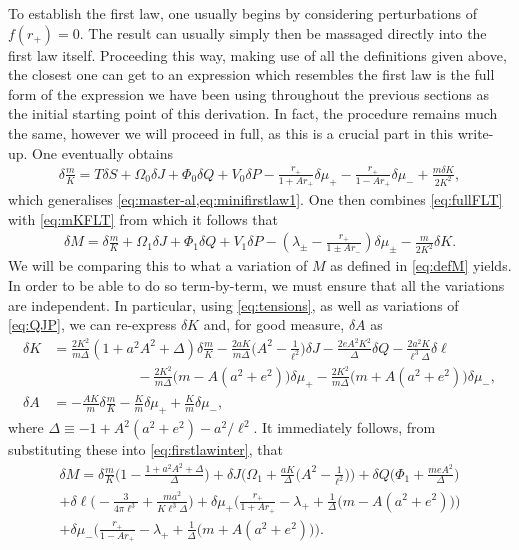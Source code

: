 \documentclass[
twoside,
openright,
frontopenright,
]{dmathesis}
\newcommand{\nn}{\nonumber}
\begin{document}
To establish the first law, one usually begins by considering perturbations of
$f(r_+)=0$. The result can usually simply then be massaged directly into the
first law itself. Proceeding this way, making use of all the definitions given
above, the closest one can get to an expression which resembles the first law is
the full form of the expression we have been using throughout the previous
sections as the initial starting point of this derivation. In fact, the
procedure remains much the same, however we will proceed in full, as this is a
crucial part in this write-up. One eventually obtains
\begin{align}\label{eq:mKFLT}
\delta \frac{m}{K} = T\delta S + \Omega_0 \delta J + \Phi_0 \delta Q + V_0
  \delta P - \frac{r_+}{1+Ar_+} \delta \mu_+ - \frac{r_+}{1-Ar_+}\delta \mu_-
  +\frac{m\delta K}{2K^2},
\end{align}
which generalises \cref{eq:master-al,eq:minifirstlaw1}. One then combines
\cref{eq:fullFLT} with \cref{eq:mKFLT} from which it follows that
\begin{align}\label{eq:firstlawinter}
\delta M = \delta \frac{m}{K} + \Omega_1 \delta J + \Phi_1 \delta Q + V_1 \delta
  P - \left(\lambda_\pm - \frac{r_+}{1\pm Ar_-}\right) \delta \mu_\pm -
  \frac{m}{2K^2}\delta K. 
\end{align}
We will be comparing this to what a variation of $M$ as defined in
\cref{eq:defM} yields. In order to be able to do so term-by-term, we must ensure
that all the variations are independent. In particular, using
\cref{eq:tensions}, as well as variations of \cref{eq:QJP}, we can re-express
$\delta K$ and, for good measure, $\delta A$ as
\begin{align}
\delta K &=\frac{2K^2}{m\Delta}(1+a^2A^2+\Delta) \delta \frac{m}{K} \nn -
           \frac{2aK}{m\Delta}\Big(A^2-\frac{1}{\ell^2}\Big)\delta
           J-\frac{2eA^2K^2}{\Delta}\delta Q-\frac{2a^2K}{\ell^3\Delta}\delta
           \ell\\ 
&\qquad\qquad\qquad -\frac{2K^2}{m\Delta}\big(m-A(a^2+e^2)\big)\delta\mu_+
                     -\frac{2K^2}{m\Delta}\big(m+A(a^2+e^2)\big)\delta\mu_-,
                     \nn\\ 
\delta A &=-\frac{A K}{m}\delta\frac{m}{K}-\frac{K}{m}\delta\mu_+ +
           \frac{K}{m}\delta \mu_-,
\label{eq:dKdA}
\end{align}
where $\Delta \equiv -1+A^2(a^2+e^2)-a^2/\ell^2 $. It immediately follows, from substituting these into \cref{eq:firstlawinter},
that
\begin{multline}
\delta M = \delta\frac{m}{K} \Big(1-\frac{1+a^2A^2+\Delta}{\Delta}\Big) 
+\delta J \bigg(\Omega_1+\frac{aK}{\Delta}\Big(A^2-\frac{1}{\ell^2}\Big)\bigg) 
+\delta Q \bigg(\Phi_1+\frac{meA^2}{\Delta}\bigg) \\
+\delta\ell \Big(-\frac{3}{4\pi\ell^3}+\frac{ma^2}{K\ell^3\Delta}\Big) 
+\delta \mu_+\Big(\frac{r_+}{1+Ar_+}-\lambda_+
+\frac{1}{\Delta}\big(m-A(a^2+e^2)\big)\Big)\\ 
+\delta \mu_-\Big(\frac{r_+}{1-Ar_+}-\lambda_+
+\frac{1}{\Delta}\big(m+A(a^2+e^2)\big)\Big). 
\label{eq:dM1}
\end{multline}
\end{document}

